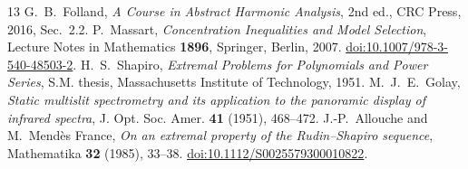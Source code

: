 \begin{thebibliography}{13}
 G.~B.~Folland, \emph{A Course in Abstract Harmonic Analysis}, 2nd ed., CRC Press, 2016, Sec.~2.2.
 P.~Massart, \emph{Concentration Inequalities and Model Selection}, Lecture Notes in Mathematics \textbf{1896}, Springer, Berlin, 2007. \href{https://doi.org/10.1007/978-3-540-48503-2}{doi:10.1007/978-3-540-48503-2}.
 H.~S.~Shapiro, \emph{Extremal Problems for Polynomials and Power Series}, S.M. thesis, Massachusetts Institute of Technology, 1951.
 M.~J.~E.~Golay, \emph{Static multislit spectrometry and its application to the panoramic display of infrared spectra}, J. Opt. Soc. Amer. \textbf{41} (1951), 468--472.
 J.-P.~Allouche and M.~Mend\`es France, \emph{On an extremal property of the Rudin--Shapiro sequence}, Mathematika \textbf{32} (1985), 33--38. \href{https://doi.org/10.1112/S0025579300010822}{doi:10.1112/S0025579300010822}.
\end{thebibliography}
